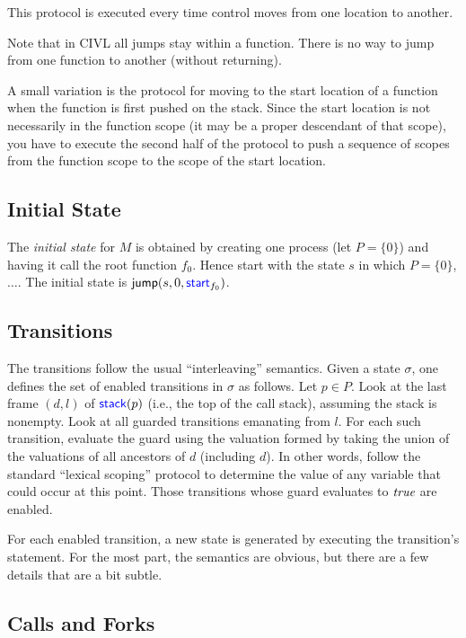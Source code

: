 \documentclass[11pt]{article}
\begin{document}
This protocol is executed every time control moves from one location
to another.

Note that in CIVL all jumps stay within a function.  There is no
way to jump from one function to another (without returning).

A small variation is the protocol for moving to the start location of
a function when the function is first pushed on the stack. Since the
start location is not necessarily in the function scope (it may be a
proper descendant of that scope), you have to execute the second half
of the protocol to push a sequence of scopes from the function scope
to the scope of the start location.

\subsection{Initial State}

The \emph{initial state} for $M$ is obtained by creating one process
(let $P=\{0\}$) and having it call the root function $f_0$. 
Hence start with the state $s$ in which $P=\{0\}$, $\ldots$.
The initial state is $\textsf{jump}(s,0,\textsf{\textcolor{blue}{\textup{start}}}_{f_0})$.

\subsection{Transitions}

The transitions follow the usual ``interleaving'' semantics. Given a
state $\sigma$, one defines the set of enabled transitions in $\sigma$
as follows. Let $p\in P$. Look at the last frame $(d,l)$ of
$\textsf{\textcolor{blue}{\textup{stack}}}(p)$ (i.e., the top of the call stack), assuming the stack is
nonempty. Look at all guarded transitions emanating from $l$. For each
such transition, evaluate the guard using the valuation formed by
taking the union of the valuations of all ancestors of $d$ (including
$d$). In other words, follow the standard ``lexical scoping'' protocol
to determine the value of any variable that could occur at this point.
Those transitions whose guard evaluates to $\emph{true}$ are enabled.

For each enabled transition, a new state is generated by executing
the transition's statement.  For the most part, the semantics are obvious,
but there are a few details that are a bit subtle.

\subsection{Calls and Forks}
\end{document}
